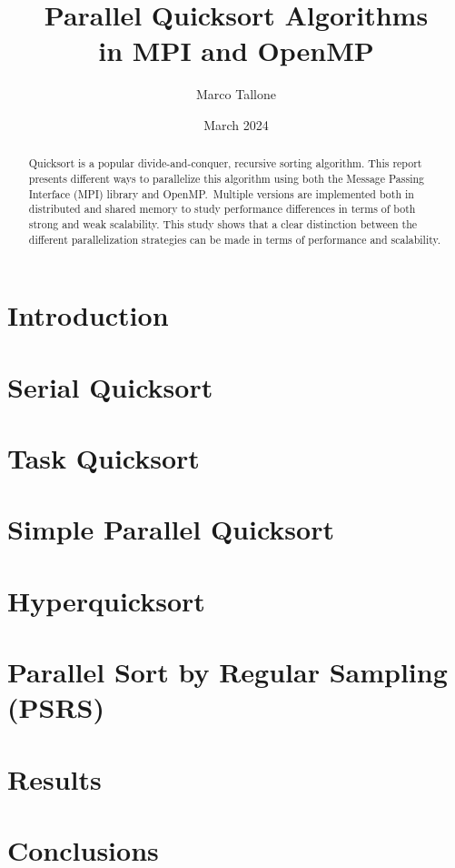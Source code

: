 \documentclass{article}
\title{Parallel Quicksort Algorithms\\in MPI and OpenMP}
\author{Marco Tallone}
\date{March 2024}
\begin{document}
\maketitle

\begin{abstract}
\noindent
Quicksort is a popular divide-and-conquer, recursive sorting algorithm.
This report presents different ways to parallelize this algorithm
using both the Message Passing Interface (MPI) library and OpenMP.\
Multiple versions are implemented both in distributed and shared memory to study performance differences in terms of both strong and weak scalability.
This study shows that a clear distinction between the different parallelization strategies can be made in terms of performance and scalability.
\end{abstract}



\section{Introduction}


\section{Serial Quicksort}

\vspace{-5mm}

\section{Task Quicksort}


\section{Simple Parallel Quicksort}


\section{Hyperquicksort}


\section{Parallel Sort by Regular Sampling (PSRS)}


\section{Results}


\section{Conclusions}



\pagebreak


\end{document}
